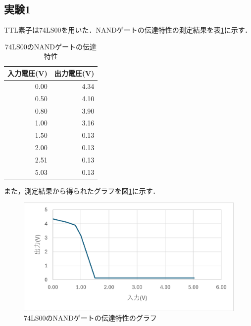\documentclass{jlreq}
\numberwithin{equation}{section}
\begin{document}
\subsection{実験1}
TTL素子は74LS00を用いた．NANDゲートの伝達特性の測定結果を表\ref{tab:io_feature}に示す．
\begin{table}[H]
  \centering
  \caption{74LS00のNANDゲートの伝達特性}
  \begin{tabular}{|r|r|}
    \hline
    入力電圧(V) & 出力電圧(V) \\ \hline
    0.00        & 4.34        \\ \hline
    0.50        & 4.10        \\ \hline
    0.80        & 3.90        \\ \hline
    1.00        & 3.16        \\ \hline
    1.50        & 0.13        \\ \hline
    2.00        & 0.13        \\ \hline
    2.51        & 0.13        \\ \hline
    5.03        & 0.13        \\ \hline
  \end{tabular}
  \label{tab:io_feature}
\end{table}

また，測定結果から得られたグラフを図\ref{fig:74LS00_io_feature}に示す．
\begin{figure}[H]
  \centering
  \includegraphics{assets/74LS00_io_feature.png}
  \caption{74LS00のNANDゲートの伝達特性のグラフ}
  \label{fig:74LS00_io_feature}
\end{figure}
\end{document}
